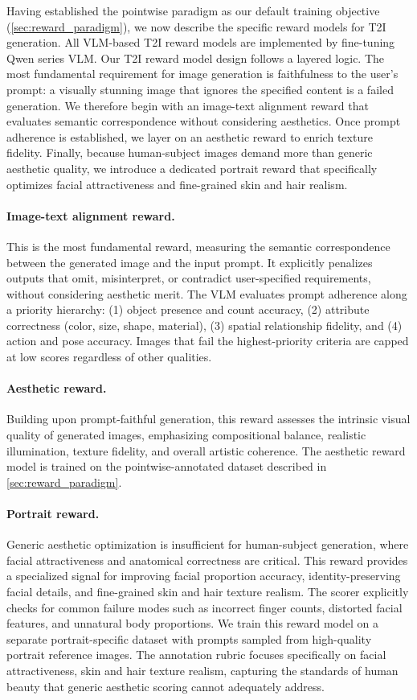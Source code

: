 \documentclass{llmxive}
\begin{document}
Having established the pointwise paradigm as our default training objective (\cref{sec:reward_paradigm}), we now describe the specific reward models for T2I generation. All VLM-based T2I reward models are implemented by fine-tuning Qwen series VLM. Our T2I reward model design follows a layered logic. The most fundamental requirement for image generation is faithfulness to the user's prompt: a visually stunning image that ignores the specified content is a failed generation. We therefore begin with an image-text alignment reward that evaluates semantic correspondence without considering aesthetics. Once prompt adherence is established, we layer on an aesthetic reward to enrich texture fidelity. Finally, because human-subject images demand more than generic aesthetic quality, we introduce a dedicated portrait reward that specifically optimizes facial attractiveness and fine-grained skin and hair realism.

\paragraph{Image-text alignment reward.} This is the most fundamental reward, measuring the semantic correspondence between the generated image and the input prompt. It explicitly penalizes outputs that omit, misinterpret, or contradict user-specified requirements, without considering aesthetic merit. The VLM evaluates prompt adherence along a priority hierarchy: (1) object presence and count accuracy, (2) attribute correctness (color, size, shape, material), (3) spatial relationship fidelity, and (4) action and pose accuracy. Images that fail the highest-priority criteria are capped at low scores regardless of other qualities.

\paragraph{Aesthetic reward.} Building upon prompt-faithful generation, this reward assesses the intrinsic visual quality of generated images, emphasizing compositional balance, realistic illumination, texture fidelity, and overall artistic coherence. The aesthetic reward model is trained on the pointwise-annotated dataset described in \cref{sec:reward_paradigm}.

\paragraph{Portrait reward.} Generic aesthetic optimization is insufficient for human-subject generation, where facial attractiveness and anatomical correctness are critical. This reward provides a specialized signal for improving facial proportion accuracy, identity-preserving facial details, and fine-grained skin and hair texture realism. The scorer explicitly checks for common failure modes such as incorrect finger counts, distorted facial features, and unnatural body proportions. We train this reward model on a separate portrait-specific dataset with prompts sampled from high-quality portrait reference images. The annotation rubric focuses specifically on facial attractiveness, skin and hair texture realism, capturing the standards of human beauty that generic aesthetic scoring cannot adequately address.
\end{document}
